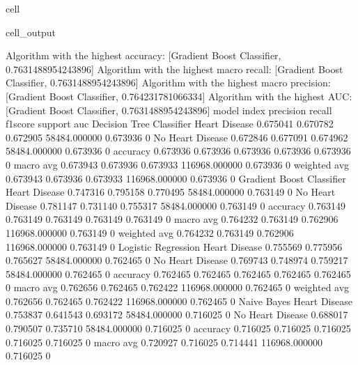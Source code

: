 \documentclass[letterpaper,10pt,english]{jupyterBook}
\begin{document}
\begin{sphinxuseclass}{cell}
\begin{sphinxVerbatimOutput}
\begin{sphinxuseclass}{cell_output}
\begin{sphinxVerbatim}[commandchars=\\\{\}]
Algorithm with the highest accuracy: [\PYGZsq{}Gradient Boost Classifier\PYGZsq{}, 0.7631488954243896]
Algorithm with the highest macro recall:
        [\PYGZsq{}Gradient Boost Classifier\PYGZsq{}, 0.7631488954243896]
Algorithm with the highest macro precision:
        [\PYGZsq{}Gradient Boost Classifier\PYGZsq{}, 0.764231781066334]
Algorithm with the highest AUC:
        [\PYGZsq{}Gradient Boost Classifier\PYGZsq{}, 0.7631488954243896]
model                      index             precision  recall    f1\PYGZhy{}score  support        auc     
Decision Tree Classifier   Heart Disease     0.675041   0.670782  0.672905  58484.000000   0.673936    0
                           No Heart Disease  0.672846   0.677091  0.674962  58484.000000   0.673936    0
                           accuracy          0.673936   0.673936  0.673936  0.673936       0.673936    0
                           macro avg         0.673943   0.673936  0.673933  116968.000000  0.673936    0
                           weighted avg      0.673943   0.673936  0.673933  116968.000000  0.673936    0
Gradient Boost Classifier  Heart Disease     0.747316   0.795158  0.770495  58484.000000   0.763149    0
                           No Heart Disease  0.781147   0.731140  0.755317  58484.000000   0.763149    0
                           accuracy          0.763149   0.763149  0.763149  0.763149       0.763149    0
                           macro avg         0.764232   0.763149  0.762906  116968.000000  0.763149    0
                           weighted avg      0.764232   0.763149  0.762906  116968.000000  0.763149    0
Logistic Regression        Heart Disease     0.755569   0.775956  0.765627  58484.000000   0.762465    0
                           No Heart Disease  0.769743   0.748974  0.759217  58484.000000   0.762465    0
                           accuracy          0.762465   0.762465  0.762465  0.762465       0.762465    0
                           macro avg         0.762656   0.762465  0.762422  116968.000000  0.762465    0
                           weighted avg      0.762656   0.762465  0.762422  116968.000000  0.762465    0
Naive Bayes                Heart Disease     0.753837   0.641543  0.693172  58484.000000   0.716025    0
                           No Heart Disease  0.688017   0.790507  0.735710  58484.000000   0.716025    0
                           accuracy          0.716025   0.716025  0.716025  0.716025       0.716025    0
                           macro avg         0.720927   0.716025  0.714441  116968.000000  0.716025    0

\end{sphinxVerbatim}
\end{sphinxuseclass}
\end{sphinxVerbatimOutput}
\end{sphinxuseclass}
\end{document}
